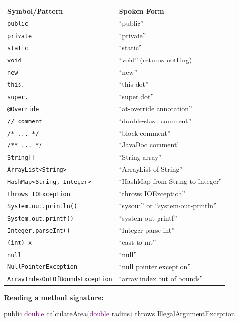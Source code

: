 \documentclass[
  justified,
  openright,
]{tufte-book}
\newcommand{\BuiltInTok}[1]{#1}
\newcommand{\DataTypeTok}[1]{\textcolor{Purple}{#1}}
\newcommand{\FunctionTok}[1]{\textcolor{BrandBlue}{#1}}
\newcommand{\KeywordTok}[1]{\textcolor{BrandBlue}{#1}}
\newcommand{\NormalTok}[1]{#1}
\newcommand{\OperatorTok}[1]{\textcolor{DarkGray}{#1}}
\newenvironment{Shaded}{%
  \begin{snugshade}
}{%
  \end{snugshade}
}
\begin{document}
{\def\LTcaptype{none} %
\begin{longtable}[]{@{}ll@{}}
\toprule\noalign{}
Symbol/Pattern & Spoken Form \\
\midrule\noalign{}
\endhead
\bottomrule\noalign{}
\endlastfoot
\texttt{public} & ``public'' \\
\texttt{private} & ``private'' \\
\texttt{static} & ``static'' \\
\texttt{void} & ``void'' (returns nothing) \\
\texttt{new} & ``new'' \\
\texttt{this.} & ``this dot'' \\
\texttt{super.} & ``super dot'' \\
\texttt{@Override} & ``at-override annotation'' \\
\texttt{//\ comment} & ``double-slash comment'' \\
\texttt{/*\ ...\ */} & ``block comment'' \\
\texttt{/**\ ...\ */} & ``JavaDoc comment'' \\
\texttt{String{[}{]}} & ``String array'' \\
\texttt{ArrayList\textless{}String\textgreater{}} & ``ArrayList of
String'' \\
\texttt{HashMap\textless{}String,\ Integer\textgreater{}} & ``HashMap
from String to Integer'' \\
\texttt{throws\ IOException} & ``throws IOException'' \\
\texttt{System.out.println()} & ``sysout'' or ``system-out-println'' \\
\texttt{System.out.printf()} & ``system-out-printf'' \\
\texttt{Integer.parseInt()} & ``Integer-parse-int'' \\
\texttt{(int)\ x} & ``cast to int'' \\
\texttt{null} & ``null'' \\
\texttt{NullPointerException} & ``null pointer exception'' \\
\texttt{ArrayIndexOutOfBoundsException} & ``array index out of
bounds'' \\
\end{longtable}
}

\textbf{Reading a method signature:}

\begin{Shaded}
\begin{Highlighting}[]
\KeywordTok{public} \DataTypeTok{double} \FunctionTok{calculateArea}\OperatorTok{(}\DataTypeTok{double}\NormalTok{ radius}\OperatorTok{)} \KeywordTok{throws} \BuiltInTok{IllegalArgumentException}
\end{Highlighting}
\end{Shaded}
\end{document}
